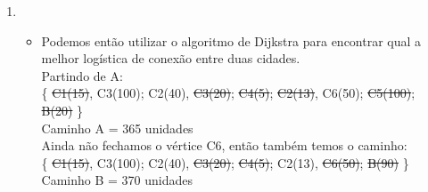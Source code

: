 \documentclass[11pt,reqno]{amsart}
\begin{document}
\begin{enumerate}
		\item

		\begin{itemize}
			\item Podemos então utilizar o algoritmo de Dijkstra para encontrar qual a melhor logística de conexão entre duas 
			cidades. \\ Partindo de A: \\ \{ \st{C1(15)}, C3(100); C2(40), \st {C3(20)}; \st{C4(5)}; \st{C2(13)}, C6(50); \st{
			C5(100)}; \st{B(20)} \} \\ Caminho A = 365 unidades \\ Ainda não fechamos o vértice C6, então também temos o 
			caminho: \\ \{ \st{C1(15)}, C3(100); C2(40), \st{C3(20)}; \st{C4(5)}; C2(13), \st{C6(50)}; \st{B(90)} \} \\ 
			Caminho B = 370 unidades
		\end{itemize}
	\end{enumerate}
\end{document}

